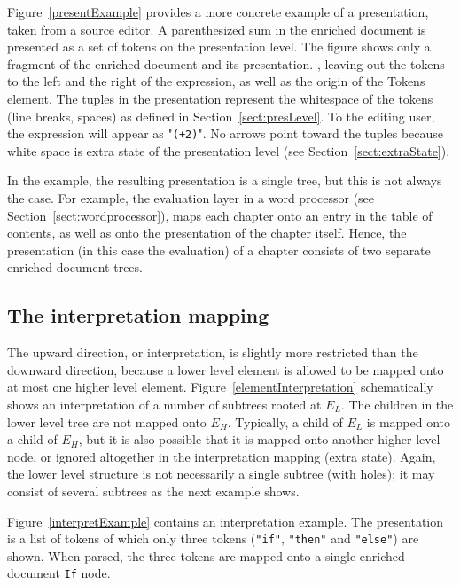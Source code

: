 Figure~\ref{presentExample} provides a more concrete example of a presentation, taken from a source editor. A parenthesized sum in the enriched document is presented as a set of tokens on the presentation level. The figure shows only a fragment of the enriched document and its presentation. \bc , leaving out the tokens to the left and the right of the expression, as well as the origin of the Tokens element. \ec The tuples in the presentation represent the whitespace of the tokens (line breaks, spaces) as defined in Section~\ref{sect:presLevel}. To the editing user, the expression will appear as "{\tt (+2\textvisiblespace )}". No arrows point toward the tuples because white space is extra state of the presentation level (see Section~\ref{sect:extraState}). 

\bc
In the example, the resulting presentation is a single tree, but this is not always the case. For example, the evaluation layer in a word processor (see Section~\ref{sect:wordprocessor}), maps each chapter onto an entry in the table of contents, as well as onto the presentation of the chapter itself. Hence, the presentation (in this case the evaluation) of a chapter consists of two separate enriched document trees.
\ec



%																
\subsection{The interpretation mapping}

The upward direction, or interpretation, is slightly more restricted than the downward direction, because a lower level element is allowed to be mapped onto at most one higher level element.  Figure~\ref{elementInterpretation} schematically shows an interpretation of a number of subtrees rooted at $E_L$. The children in the lower level tree are not mapped onto $E_H$. Typically, a child of $E_L$ is mapped onto a child of $E_H$, but it is also possible that it is mapped onto another higher level node, or ignored altogether in the interpretation mapping (extra state).  Again, the lower level structure is not necessarily a single subtree (with holes); it may consist of several subtrees as the next example shows.

Figure~\ref{interpretExample} contains an interpretation example. The presentation is a list of tokens of which only three tokens (\verb|"if"|, \verb|"then"| and \verb|"else"|) are shown. When parsed, the three tokens are mapped onto a single enriched document \verb|If| node. 

